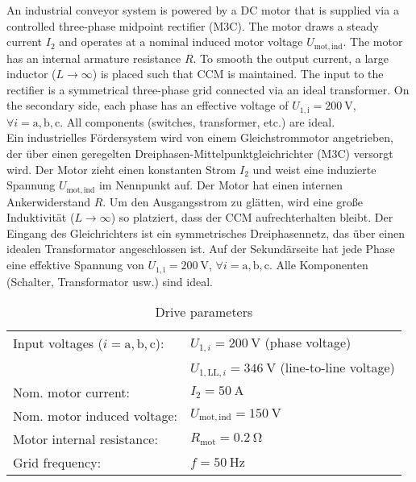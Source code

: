 

An industrial conveyor system is powered by a DC motor that is supplied via a controlled three-phase 
midpoint rectifier (M3C). The motor draws a steady current $I_\mathrm{2}$ and operates at a nominal induced  
motor voltage $U_\mathrm{mot,ind}$. The motor has an internal armature resistance $R$. To smooth the output
current, a large inductor ($L \to  \infty$) is placed such that CCM is 
maintained. The input to the rectifier is a symmetrical three-phase grid connected via an ideal 
transformer. On the secondary side, each phase has an effective voltage of 
$U_\mathrm{1,i} = \SI{200}{\volt}$, $\forall i=\mathrm{a, b, c}$. All components (switches, transformer, 
etc.) are ideal.\\
\color{gray}
Ein industrielles Fördersystem wird von einem Gleichstrommotor angetrieben, der über einen geregelten 
Dreiphasen-Mittelpunktgleichrichter (M3C) versorgt wird. Der Motor zieht einen konstanten Strom 
$I_\mathrm{2}$ und weist eine induzierte Spannung $U_\mathrm{mot,ind}$ im Nennpunkt auf. Der Motor hat einen internen 
Ankerwiderstand $R$. Um den Ausgangsstrom zu glätten, wird eine große Induktivität ($L \to  \infty$) so 
platziert, dass der CCM aufrechterhalten bleibt. Der Eingang des Gleichrichters 
ist ein symmetrisches Dreiphasennetz, das über einen idealen Transformator angeschlossen ist. Auf
der Sekundärseite hat jede Phase eine effektive Spannung von $U_\mathrm{1,i} = \SI{200}{\volt}$, 
$\forall i=\mathrm{a, b, c}$. Alle Komponenten (Schalter, Transformator usw.) sind ideal.

\color{black}

\begin{table}[ht]
    \centering  %
    \begin{tabular}{ll}
        \toprule
        Input voltages ($i=\mathrm{a,b,c}$): & $U_{\mathrm{1},i}=\SI{200}{\volt}$ (phase voltage) \\
                        & $U_{\mathrm{1,LL},i} = \SI{346}{\volt}$ (line-to-line voltage)\\
        Nom. motor current: & $I_{\mathrm{2}} = \SI{50}{\ampere}$ \\
        Nom. motor induced voltage: & $U_\mathrm{mot,ind} = \SI{150}{\volt}$ \\ 
        Motor internal resistance: & $R_\mathrm{mot} = \SI{0.2}{\ohm}$\\ 
        Grid frequency: & $f= \SI{50}{\hertz}$ \\ 
        \bottomrule
    \end{tabular}
    \caption{Drive parameters}  
    \label{table:Task03_ParametersOfTheCircuit}
\end{table}

